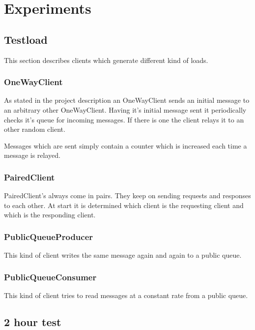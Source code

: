 \documentclass[milestone1.tex]{subfiles}
\begin{document}
\section{Experiments}

\subsection{Testload}
This section describes clients which generate different kind of loads.

\subsubsection{OneWayClient}
As stated in the project description an OneWayClient sends an initial message to an arbitrary other OneWayClient. Having it's initial message sent it periodically checks it's queue for incoming messages. If there is one the client relays it to an other random client.

Messages which are sent simply contain a counter which is increased each time a message is relayed.

\subsubsection{PairedClient}
PairedClient's always come in pairs. They keep on sending requests and responses to each other. At start it is determined which client is the requesting client and which is the responding client.

\subsubsection{PublicQueueProducer}
This kind of client writes the same message again and again to a public queue.

\subsubsection{PublicQueueConsumer}
This kind of client tries to read messages at a constant rate from a public queue.

\subsection{2 hour test}


\end{document}
